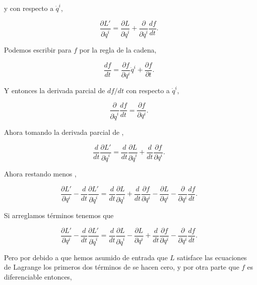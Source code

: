 \documentclass[a4paper,10pt]{article}
\numberwithin{equation}{section}
\begin{document}
y con respecto a $\dot{q}^i$,

\begin{equation}
 \frac{\partial L'}{\partial \dot{q}^i} = \frac{\partial L}{\partial \dot{q}^i} + 
 \frac{\partial}{\partial \dot{q}^i} \frac{df}{dt}.
 \label{eq:4part3}
\end{equation}

Podemos escribir para $f$ por la regla de la cadena,

\begin{equation}
 \frac{df}{dt} = \frac{\partial f}{\partial q^i}\dot{q}^i + \frac{\partial f}{\partial t}.
 \label{eq:4part4}
\end{equation}

Y entonces la derivada parcial de $df/dt$ con respecto a $\dot{q}^i$,

\begin{equation}
 \frac{\partial}{\partial \dot{q}^i} \frac{df}{dt} = \frac{\partial f}{\partial q^i}.
 \label{eq:4part5}
\end{equation}

Ahora tomando la derivada parcial de ,

\begin{equation}
 \frac{d}{dt}\frac{\partial L'}{\partial \dot{q}^i} = \frac{d}{dt}\frac{\partial L}{\partial \dot{q}^i}
 + \frac{d}{dt}\frac{\partial f}{\partial q^i}.
 \label{eq:4part6}
\end{equation}

Ahora restando  menos , 

\begin{equation}
 \frac{\partial L'}{\partial q^i} - \frac{d}{dt}\frac{\partial L'}{\partial \dot{q}^i} = 
 \frac{d}{dt}\frac{\partial L}{\partial \dot{q}^i}
 + \frac{d}{dt}\frac{\partial f}{\partial q^i} - \frac{\partial L}{\partial q^i} - 
 \frac{\partial}{\partial q^i} \frac{df}{dt}.
\end{equation}

Si arreglamos términos tenemos que 

\begin{equation}
  \frac{\partial L'}{\partial q^i} - \frac{d}{dt}\frac{\partial L'}{\partial \dot{q}^i} = 
\frac{d}{dt}\frac{\partial L}{\partial \dot{q}^i} - \frac{\partial L}{\partial q^i} + 
\frac{d}{dt}\frac{\partial f}{\partial q^i} - \frac{\partial}{\partial q^i} \frac{df}{dt}.
\label{eq:4part7}
\end{equation}

Pero por debido a que hemos asumido de entrada que  $L$ satisface las ecuaciones de 
Lagrange los primeros dos términos de  se hacen cero, y por otra parte 
que $f$ es diferenciable entonces,
\end{document}
